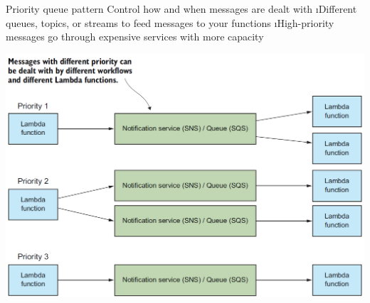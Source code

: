 \begin{frame}{Priority queue pattern}
Control how and when messages are dealt with
\i Different queues, topics, or streams to feed messages to your functions 
\i High-priority messages go through expensive services with more capacity

\includegraphics[scale=.4]{imgs/pattern_priority.PNG}
\end{frame}



